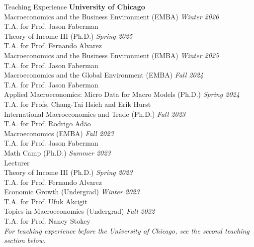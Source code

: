 \documentclass{resume} %
\begin{document}
		\begin{rSection}{Teaching Experience}
			\textbf{University of Chicago}\\
			Macroeconomics and the Business Environment (EMBA) \hfill {\em Winter 2026}\\[-0.25em]
			{\small T.A. for Prof. Jason Faberman}\\[0.35em]
			Theory of Income III (Ph.D.) \hfill {\em Spring 2025}\\[-0.25em]
			{\small T.A. for Prof. Fernando Alvarez}\\[0.35em]
			Macroeconomics and the Business Environment (EMBA) \hfill {\em Winter 2025}\\[-0.25em]
			{\small T.A. for Prof. Jason Faberman}\\[0.35em]
			Macroeconomics and the Global Environment (EMBA) \hfill {\em Fall 2024}\\[-0.25em]
			{\small T.A. for Prof. Jason Faberman}\\[0.35em]
			Applied Macroeconomics: Micro Data for Macro Models (Ph.D.) \hfill {\em Spring 2024}\\[-0.25em]
			{\small T.A. for Profs. Chang-Tai Hsieh and Erik Hurst}\\[0.35em]
			International Macroeconomics and Trade (Ph.D.) \hfill {\em Fall 2023}\\[-0.25em]
			{\small T.A. for Prof. Rodrigo Adão}\\[0.35em]
			Macroeconomics (EMBA) \hfill {\em Fall 2023}\\[-0.25em]
			{\small T.A. for Prof. Jason Faberman}\\[0.35em]
			Math Camp (Ph.D.) \hfill {\em Summer 2023}\\[-0.25em]
			{\small Lecturer}\\[0.35em]
			Theory of Income III (Ph.D.) \hfill {\em Spring 2023}\\[-0.25em]
			{\small T.A. for Prof. Fernando Alvarez}\\[0.35em]
			Economic Growth (Undergrad) \hfill {\em Winter 2023}\\[-0.25em]
			{\small T.A. for Prof. Ufuk Akcigit}\\[0.35em]
			Topics in Macroeconomics (Undergrad) \hfill {\em Fall 2022}\\[-0.25em]
			{\small T.A. for Prof. Nancy Stokey}\\[0.5em]
			{\small\textit{For teaching experience before the University of Chicago, see the second teaching section below.}}
	\end{rSection}
\end{document}

